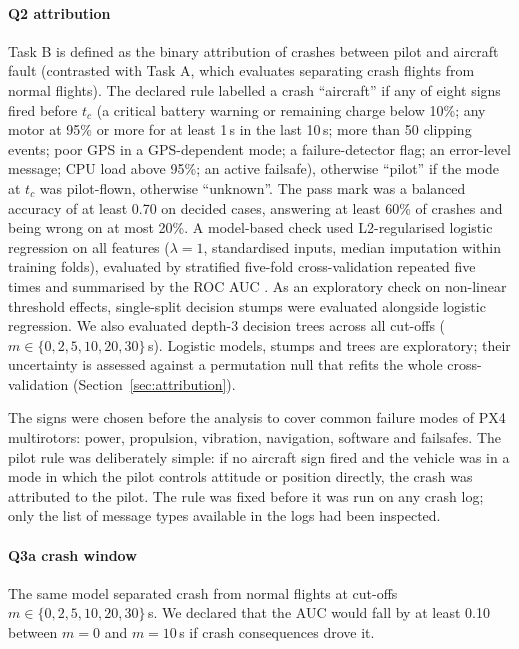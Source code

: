 \documentclass[preprint,12pt]{elsarticle}
\begin{document}
\paragraph{Q2 attribution} Task B is defined as the binary attribution of crashes between pilot and aircraft fault (contrasted with Task A, which evaluates separating crash flights from normal flights).
The declared rule labelled a crash ``aircraft'' if any of eight signs fired before $t_c$ (a critical battery warning
or remaining charge below 10\%; any motor at 95\% or more for at least 1\,s in the last 10\,s; more than 50 clipping
events; poor GPS in a GPS-dependent mode; a failure-detector flag; an error-level message; CPU load above 95\%; an
active failsafe), otherwise ``pilot'' if the mode at $t_c$ was pilot-flown, otherwise ``unknown''. The pass mark was a
balanced accuracy of at least 0.70 on decided cases, answering at least 60\% of crashes and being wrong on at most 20\%.
A model-based check used L2-regularised logistic regression on all features ($\lambda=1$, standardised inputs, median
imputation within training folds), evaluated by stratified five-fold cross-validation repeated five times and summarised
by the ROC AUC \cite{hanley1982roc}. As an exploratory check on non-linear threshold effects, single-split decision stumps were evaluated alongside logistic regression. We also evaluated depth-3 decision trees across all cut-offs ($m \in \{0, 2, 5, 10, 20, 30\}$\,s). Logistic models, stumps and trees are exploratory; their uncertainty is assessed against a permutation null that refits the whole cross-validation (Section~\ref{sec:attribution}).

The signs were chosen before the analysis to cover common failure modes of PX4 multirotors: power, propulsion,
vibration, navigation, software and failsafes. The pilot rule was deliberately simple: if no aircraft sign fired and
the vehicle was in a mode in which the pilot controls attitude or position directly, the crash was attributed to the
pilot. The rule was fixed before it was run on any crash log; only the list of message types available in the logs had
been inspected.

\paragraph{Q3a crash window} The same model separated crash from normal flights at cut-offs $m\in\{0,2,5,10,20,30\}$\,s.
We declared that the AUC would fall by at least 0.10 between $m=0$ and $m=10$\,s if crash consequences drove it.
\end{document}
